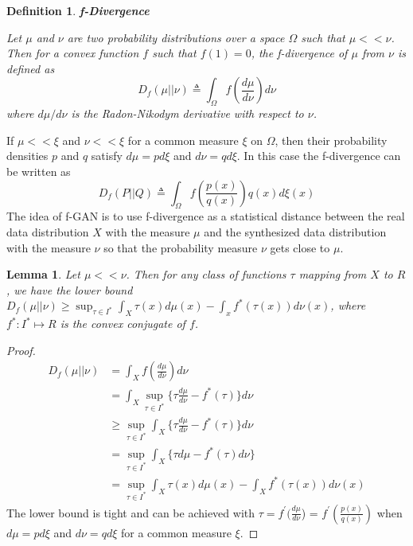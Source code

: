 \documentclass[12pt]{amsart}
\newtheorem{definition}{Definition}
\theoremstyle{plain}
\newtheorem{lemma}[thm]{Lemma}
\theoremstyle{definition}
\theoremstyle{remark}
\numberwithin{equation}{section}
\numberwithin{thm}{section}
\begin{document}
\begin{definition} 
\textbf{f-Divergence}

Let $\mu$ and $\nu$ are two probability distributions over a space $\Omega$ such that $\mu<<\nu$. Then for a convex function $f$ such that $f(1)=0$, the f-divergence of $\mu$ from $\nu$ is defined as 
\begin{equation}
    D_{f}(\mu||\nu) \triangleq \int_{\Omega}f(\frac{d\mu}{d\nu})d\nu
\end{equation}
where $d\mu/d\nu$ is the Radon-Nikodym derivative with respect to $\nu$.
\end{definition}
If $\mu<<\xi$ and $\nu<<\xi$ for a common measure $\xi$ on $\Omega$, then their probability densities $p$ and $q$ satisfy $d\mu=pd\xi$ and $d\nu=qd\xi$. In this case the f-divergence can be written as 
\begin{equation}
    D_{f}(P||Q) \triangleq \int_{\Omega}f(\frac{p(x)}{q(x)})q(x)d\xi(x)    
\end{equation}
The idea of f-GAN is to use f-divergence as a statistical distance between the real data distribution $X$ with the measure $\mu$ and the synthesized data distribution with the measure $\nu$ so that the probability measure $\nu$ gets close to $\mu$.
\begin{lemma}
    Let $\mu << \nu$. Then for any class of functions $\tau$ mapping from $X$ to $R$, we have the lower bound $D_{f}(\mu||\nu) \geq \sup_{\tau \in I^{*}} \int_{X} \tau(x)d\mu(x)-\int_{x}f^{*}(\tau(x))d\nu(x)$, where $f^{*}: I^{*} \mapsto R$ is the convex conjugate of $f$.
\end{lemma}
\begin{proof}
\begin{equation*}
\begin{aligned}
     D_{f}(\mu||\nu) & = \int_{X}f(\frac{d\mu}{d\nu})d\nu \\
     &= \int_{X}\sup_{\tau \in I^{*}} \{\tau\frac{d\mu}{d\nu}-f^{*}(\tau)\}d\nu \\
     & \geq \sup_{\tau \in I^{*}} \int_{X} \{ \tau\frac{d\mu}{d\nu}-f^{*}(\tau) \}d\nu \\ %
     & = \sup_{\tau \in I^{*}} \int_{X} \{ \tau d\mu-f^{*}(\tau)d\nu \}\\
     & = \sup_{\tau \in I^{*}} \int_{X} \tau(x) d\mu(x)-\int_{X}f^{*}(\tau(x))d\nu(x) 
\end{aligned}
\end{equation*}
The lower bound is tight and can be achieved with $\tau=f^{'}(\frac{d\mu}{d\nu}$) = $f^{'}(\frac{p(x)}{q(x)})$ when $d\mu = pd\xi$ and $d\nu=qd\xi$ for a common measure $\xi$.    
\end{proof}
\end{document}
